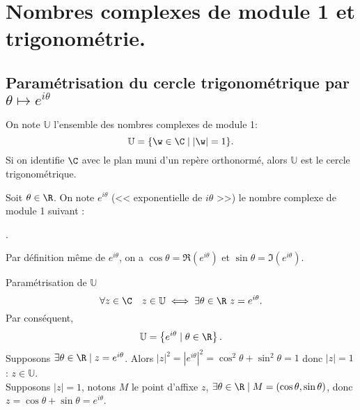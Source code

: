 \documentclass[11pt]{article}
\newcommand*{\U}{\mathbb{U}}
\begin{document}


\thispagestyle{fancy}

\section{Nombres complexes de module 1 et trigonométrie.}

\subsection{Paramétrisation du cercle trigonométrique par \texorpdfstring{$\theta\mapsto e^{i\theta}$}{Lg}}

\begin{defi}{}{}
    On note $\U$ l'ensemble des nombres complexes de module 1:
    \begin{equation*}
        \U=\{\w\in\C\mid|\w|=1\}.
    \end{equation*}
    Si on identifie $\C$ avec le plan muni d'un repère orthonormé, alors $\U$ est le cercle trigonométrique.
\end{defi}

\begin{defi}{}{}
    Soit $\theta\in\R$. On note $e^{i\theta}$ (<< exponentielle de $i\theta$ >>) le nombre complexe de module 1 suivant :
    \begin{center}
        .
    \end{center}
    Par définition même de $e^{i\theta}$, on a $\cos\theta=\Re(e^{i\theta})$ et $\sin\theta=\Im(e^{i\theta})$.
\end{defi}

\begin{prop}{Paramétrisation de $\U$}{}
    \begin{equation*}
        \forall z \in \C\quad z\in\U\iff \exists\theta\in\R~z=e^{i\theta}.
    \end{equation*}
    Par conséquent,
    \begin{equation*}
        \U = \left\{ e^{i\theta }\mid \theta\in\R \right\}.
    \end{equation*}
    \tcblower
    \boxed{\la} Supposons $\exists \theta\in\R\mid z=e^{i\theta}$. Alors $|z|^2=|e^{i\theta}|^2=\cos^2\theta+\sin^2\theta=1$ donc $|z|=1$ : $z\in\U$.\\
    \boxed{\ra} Supposons $|z|=1$, notons $M$ le point d'affixe $z$, $\exists \theta\in\R\mid M=(\cos \theta, \sin \theta)$, donc $z=\cos\theta+\sin\theta=e^{i\theta}$.
\end{prop}
\end{document}
